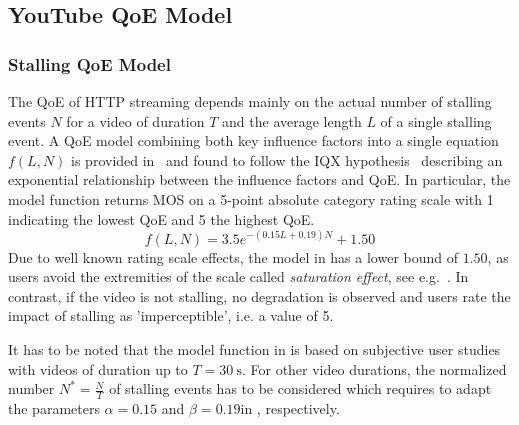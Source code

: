 \subsection{YouTube QoE Model}\label{sec:application:qoe_user_behaviour:typical_user_scenarios:youtube_qoe}
\subsubsection*{Stalling QoE Model}\label{sec:application:qoe_user_behaviour:typical_user_scenarios:youtube_qoe:stalling}
The \gls{QoE} of \gls{HTTP} streaming depends mainly on the actual number of stalling events \(N\) for a video of duration \(T\) and the average length \(L\) of a single stalling event.
A \gls{QoE} model combining both key influence factors into a single equation \(f(L,N)\) is provided in~\cite{Hossfeld2013c} and found to follow the IQX hypothesis~\cite{Fiedler2010} describing an exponential relationship between the influence factors and \gls{QoE}.
In particular, the model function returns \gls{MOS} on a 5-point absolute category rating scale with 1 indicating the lowest \gls{QoE} and 5 the highest \gls{QoE}. 
\begin{equation}
 f(L,N) = 3.5 e^{-(0.15L + 0.19)N}+1.50
\label{eq:application:qoe_user_behaviour:typical_user_scenarios:youtube_qoe:stalling:original_model}
\end{equation}
Due to well known rating scale effects, the model in  has a lower bound of \(1.50\), as users avoid the extremities of the scale called \emph{saturation effect}, see e.g.~\cite{Moller2000}.
In contrast, if the video is not stalling, no degradation is observed and users rate the impact of stalling as 'imperceptible', i.e. a value of 5.

It has to be noted that the model function in  is based on subjective user studies with videos of duration up to \(T=\SI{30}{\second}\).
For other video durations, the normalized number \(N^*=\frac{N}{T}\) of stalling events has to be considered which requires to adapt the parameters \(\alpha=0.15\) and \(\beta=0.19\)in , respectively. 

